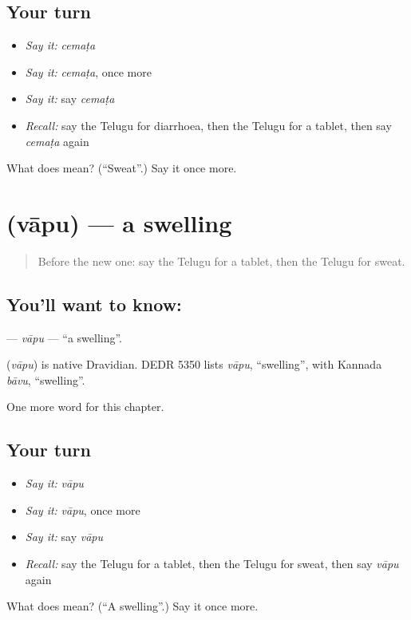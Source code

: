 \subsection*{Your turn}
\begin{itemize}
\raggedright
  \item \emph{Say it:} \emph{cemaṭa}
  \item \emph{Say it:} \emph{cemaṭa}, once more
  \item \emph{Say it:} say \emph{cemaṭa}
  \item \emph{Recall:} say the Telugu for diarrhoea, then the Telugu for a tablet, then say \emph{cemaṭa} again
\end{itemize}

\begin{tcolorbox}[breakable,colback=teal!4,colframe=teal!35!black,title={Before you move on}]
What does  mean? (\textquotedblleft{}Sweat\textquotedblright{}.) Say it once more.
\end{tcolorbox}
\section[\texorpdfstring{\te{వాపు} (vāpu)}{వాపు (vāpu)}]{ (vāpu) — a swelling}

\label{lesson:TE-C167-vapu}



\begin{quote}
Before the new one: say the Telugu for a tablet, then the Telugu for sweat.
\end{quote}

\subsection*{You'll want to know: }
\textbf{} — \emph{vāpu} — \textquotedblleft{}a swelling\textquotedblright{}.

\begin{cousinweb}
\textbf{} (\emph{vāpu}) is native Dravidian. DEDR 5350 lists \emph{vāpu}, \textquotedblleft{}swelling\textquotedblright{}, with Kannada \emph{bāvu}, \textquotedblleft{}swelling\textquotedblright{}.
\end{cousinweb}

\begin{grammarlens}[title={What you've built}]
One more word for this chapter.
\end{grammarlens}

\subsection*{Your turn}
\begin{itemize}
\raggedright
  \item \emph{Say it:} \emph{vāpu}
  \item \emph{Say it:} \emph{vāpu}, once more
  \item \emph{Say it:} say \emph{vāpu}
  \item \emph{Recall:} say the Telugu for a tablet, then the Telugu for sweat, then say \emph{vāpu} again
\end{itemize}

\begin{tcolorbox}[breakable,colback=teal!4,colframe=teal!35!black,title={Before you move on}]
What does  mean? (\textquotedblleft{}A swelling\textquotedblright{}.) Say it once more.
\end{tcolorbox}
